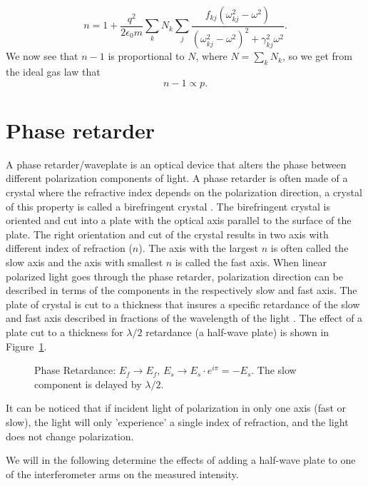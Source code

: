 \[n = 1 + \frac{q^2}{2\epsilon_0 m} \sum_k N_k \sum_j \frac{f_{kj}(\omega_{kj}^2 - \omega^2)}{(\omega_{kj}^2 - \omega^2)^2 + \gamma_{kj}^2 \omega^2} .  \]
We now see that $n - 1$ is proportional to $N$, where $N = \sum_k N_k$, so we get from the ideal gas law that
\begin{equation}
    n - 1 \propto p. \label{prop_to_pressure}
\end{equation}
\section{Phase retarder}
A phase retarder/waveplate is an optical device that alters the phase between different polarization components of light.
A phase retarder is often made of a crystal where the refractive index depends on the polarization direction, a crystal of this property is called a birefringent crystal \autocite{paschotta_birefringence}.
The birefringent crystal is oriented and cut into a plate with the optical axis parallel to the surface of the plate.
The right orientation and cut of the crystal results in two axis with different index of refraction ($n$).
The axis with the largest $n$ is often called the slow axis and the axis with smallest $n$ is called the fast axis.
When linear polarized light goes through the phase retarder, polarization direction can be described in terms of the components in the respectively slow and fast axis.
The plate of crystal is cut to a thickness that insures a specific retardance of the slow and fast axis described in fractions of the wavelength of the light \autocite{paschotta_retardance}.
The effect of a plate cut to a thickness for $\lambda/2$ retardance (a half-wave plate) is shown in Figure~\ref{fig:HWP_TikZ_drawing}.

\begin{figure}
    
    \caption{Phase Retardance:
        $E_f \rightarrow E_f$, $E_s \rightarrow E_s \cdot e^{i\pi} = -E_s$.
        The slow component is delayed by $\lambda/2$.}
        \label{fig:HWP_TikZ_drawing}
\end{figure}
It can be noticed that if incident light of polarization in only one axis (fast or slow), the light will only 'experience' a single index of refraction, and the light does not change polarization.

We will in the following determine the effects of adding a half-wave plate to one of the interferometer arms on the measured intensity.
